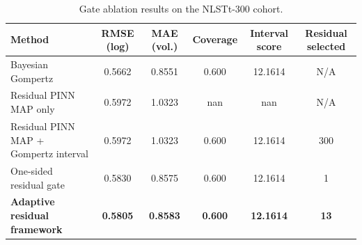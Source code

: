\begin{table}[t]
\centering
\caption{Gate ablation results on the NLSTt-300 cohort.}
\begin{tabular}{lccccc}
\toprule
Method & RMSE (log) & MAE (vol.) & Coverage & Interval score & Residual selected \\
\midrule
Bayesian Gompertz & 0.5662 & 0.8551 & 0.600 & 12.1614 & N/A \\
Residual PINN MAP only & 0.5972 & 1.0323 & nan & nan & N/A \\
Residual PINN MAP + Gompertz interval & 0.5972 & 1.0323 & 0.600 & 12.1614 & 300 \\
One-sided residual gate & 0.5830 & 0.8575 & 0.600 & 12.1614 & 1 \\
\textbf{Adaptive residual framework} & \textbf{0.5805} & \textbf{0.8583} & \textbf{0.600} & \textbf{12.1614} & \textbf{13} \\
\bottomrule
\end{tabular}
\end{table}
